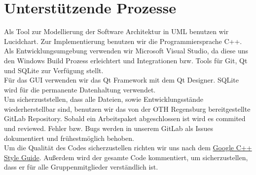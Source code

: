 \documentclass[12pt,a4paper,onecolumn]{article}
\begin{document}
\section{Unterstützende Prozesse}
Als Tool zur Modellierung der Software Architektur in UML benutzen wir Lucidchart.
Zur Implementierung benutzen wir die Programmiersprache C++. Als Entwicklungsumgebung verwenden wir Microsoft Visual Studio, da diese uns den Windows Build Prozess erleichtert und Integrationen bzw. Tools für Git, Qt und SQLite zur Verfügung stellt.\\
Für das GUI verwenden wir das Qt Framework mit dem Qt Designer. SQLite wird für die permanente Datenhaltung verwendet.\\
Um sicherzuststellen, dass alle Dateien, sowie Entwicklungsstände wiederherstellbar sind, benutzen wir das von der OTH Regensburg bereitgestellte GitLab Repository. Sobald ein Arbeitspaket abgeschlossen ist wird es commited und reviewed. Fehler bzw. Bugs werden in unserem GitLab als Issues dokumentiert und frühestmöglich behoben.\\
Um die Qualität des Codes sicherzustellen richten wir uns nach dem \href{https://google.github.io/styleguide/cppguide.html}{Google C++ Style Guide}. Außerdem wird der gesamte Code kommentiert, um sicherzustellen, dass er für alle Gruppenmitglieder verständlich ist.\\
\end{document}
